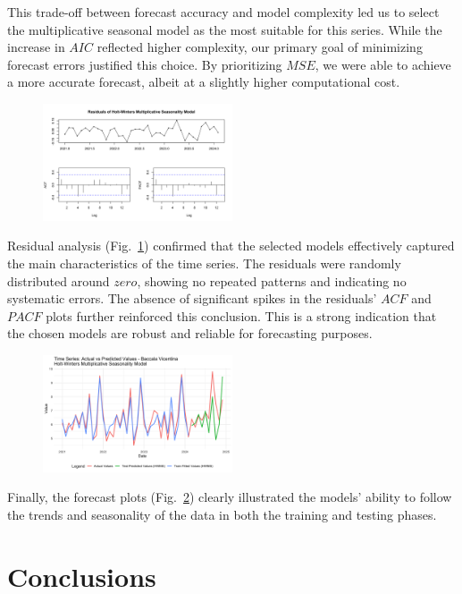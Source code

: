 \documentclass[10pt,twocolumn,letterpaper]{article}
\begin{document}
This trade-off between forecast accuracy and model complexity led us to select the multiplicative seasonal model as the most suitable for this series. While the increase in $AIC$ reflected higher complexity, our primary goal of minimizing forecast errors justified this choice. By prioritizing $MSE$, we were able to achieve a more accurate forecast, albeit at a slightly higher computational cost.
\begin{figure}[h!]
    \centering
    \includegraphics[width=0.5\textwidth]{PlotsBEFD/Residuals_HWM_V.png} 
    \caption{}
    \label{fig:Residuals_HWM_V}
\end{figure}
Residual analysis (Fig.~\ref{fig:Residuals_HWM_V}) confirmed that the selected models effectively captured the main characteristics of the time series. The residuals were randomly distributed around $zero$, showing no repeated patterns and indicating no systematic errors. The absence of significant spikes in the residuals' $ACF$ and $PACF$ plots further reinforced this conclusion. This is a strong indication that the chosen models are robust and reliable for forecasting purposes.
\begin{figure}[h!]
    \centering
    \includegraphics[width=0.5\textwidth]{PlotsBEFD/TS_HWM_V.png} 
    \caption{}
    \label{fig:TS_HWM_V}
\end{figure}
Finally, the forecast plots (Fig.~\ref{fig:TS_HWM_V}) clearly illustrated the models' ability to follow the trends and seasonality of the data in both the training and testing phases.

\section{Conclusions}
\end{document}
